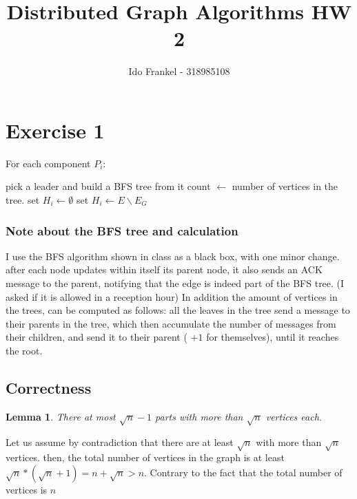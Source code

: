\documentclass[11pt]{article}
\newtheorem{lemma}[theorem]{Lemma}
\begin{document}
\author{Ido Frankel - 318985108}
\title{Distributed Graph Algorithms HW 2}
\maketitle

\medskip


\section{Exercise 1}
For each component $P_i$:
\begin{algorithmic}[1]
\State pick a leader and build a BFS tree from it
\State count $\leftarrow$ number of vertices in the tree.
    \State set $H_i \leftarrow \emptyset$
\Else
    \State set $H_i \leftarrow E \backslash E_G$
\EndIf
\end{algorithmic}

\subsubsection*{Note about the BFS tree and calculation}
I use the BFS algorithm shown in class as a black box, with one minor change. after each node updates within itself its parent node, it also sends an ACK message to the parent, notifying that the edge is indeed part of the BFS tree. (I asked if it is allowed in a reception hour)
In addition the amount of vertices in the trees, can be computed as follows: all the leaves in the tree send a message to their parents in the tree, which then accumulate the number of messages from their children, and send it to their parent ( $+1$ for themselves), until it reaches the root.

\subsection*{Correctness}

\begin{lemma}
\label{parts_bound_amount}
There at most $\sqrt{n} -1 $ parts with more than $\sqrt{n}$ vertices each.
\end{lemma}
Let us assume by contradiction that there are at least $\sqrt{n}$ with more than $\sqrt{n}$ vertices. then, the total number of vertices in the graph is at least $\sqrt{n} * (\sqrt{n} +1 )= n + \sqrt{n} > n$. Contrary to the fact that the total number of vertices is $n$
\end{document}
